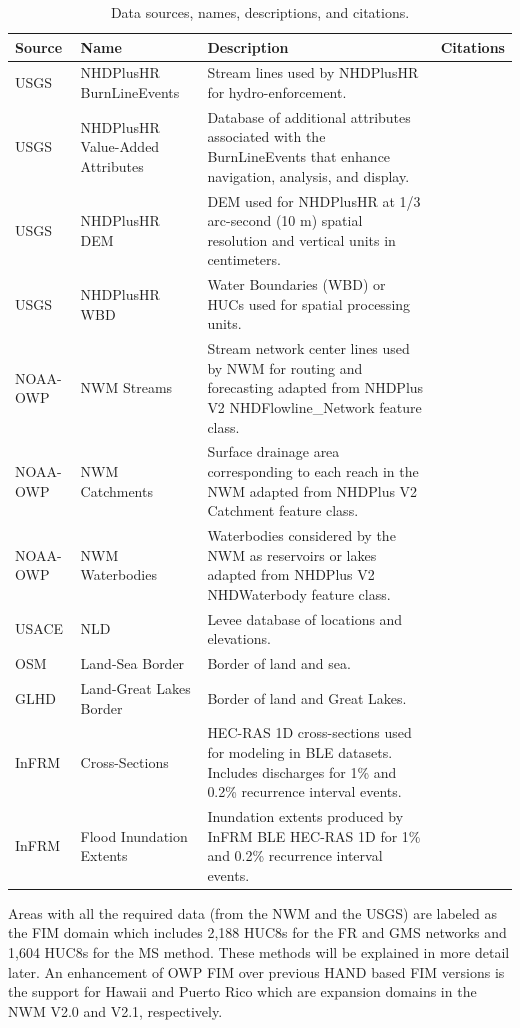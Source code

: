 \documentclass[draft]{dependencies/agujournal2019}
\begin{document}
%
\begin{table}
\caption{Data sources, names, descriptions, and citations.}
\label{tab:data}
\centering
\begin{tabular}{|p{1.75cm}|p{4cm}|p{11cm}|p{5cm}|}
\hline
Source & Name & Description & Citations\\
\hline
USGS & NHDPlusHR BurnLineEvents & Stream lines used by NHDPlusHR for hydro-enforcement. & \cite{nhdplus2022vectors} \\
\hline
USGS & NHDPlusHR Value-Added Attributes & Database of additional attributes associated with the BurnLineEvents that enhance navigation, analysis, and display. & \cite{nhdplus2022vectors} \\
\hline
USGS & NHDPlusHR DEM & DEM used for NHDPlusHR at 1/3 arc-second (10 m) spatial resolution and vertical units in centimeters. & \cite{nhdplus2022dems} \\
\hline
USGS & NHDPlusHR WBD & Water Boundaries (WBD) or HUCs used for spatial processing units. & \cite{nhdplus2022wbd} \\
\hline
NOAA-OWP & NWM Streams & Stream network center lines used by NWM for routing and forecasting adapted from NHDPlus V2 NHDFlowline\_Network feature class. & \cite{nwm2022hydrofabric} \\
\hline
NOAA-OWP & NWM Catchments & Surface drainage area corresponding to each reach in the NWM adapted from NHDPlus V2 Catchment feature class. & \cite{nwm2022hydrofabric} \\
\hline
NOAA-OWP & NWM Waterbodies & Waterbodies considered by the NWM as reservoirs or lakes adapted from NHDPlus V2 NHDWaterbody feature class. & \cite{nwm2022hydrofabric} \\
\hline
USACE & NLD & Levee database of locations and elevations. & \cite{engineers2016national} \\
\hline
OSM & Land-Sea Border & Border of land and sea. & \cite{osm2021landsea} \\
\hline
GLHD & Land-Great Lakes Border & Border of land and Great Lakes. & \cite{GreatLakesHydrographyDataset} \\
\hline
InFRM & Cross-Sections & HEC-RAS 1D cross-sections used for modeling in BLE datasets. Includes discharges for 1\% and 0.2\% recurrence interval events. & \cite{fema2021estimated} \\
\hline
InFRM & Flood Inundation Extents & Inundation extents produced by InFRM BLE HEC-RAS 1D for 1\% and 0.2\% recurrence interval events. & \cite{fema2021estimated} \\
\hline
\end{tabular}
\end{table}
%
Areas with all the required data (from the NWM and the USGS) are labeled as the FIM domain which includes 2,188 HUC8s for the FR and GMS networks and 1,604 HUC8s for the MS method. 
These methods will be explained in more detail later.
An enhancement of OWP FIM over previous HAND based FIM versions is the support for Hawaii and Puerto Rico which are expansion domains in the NWM V2.0 and V2.1, respectively.
%
\end{document}
